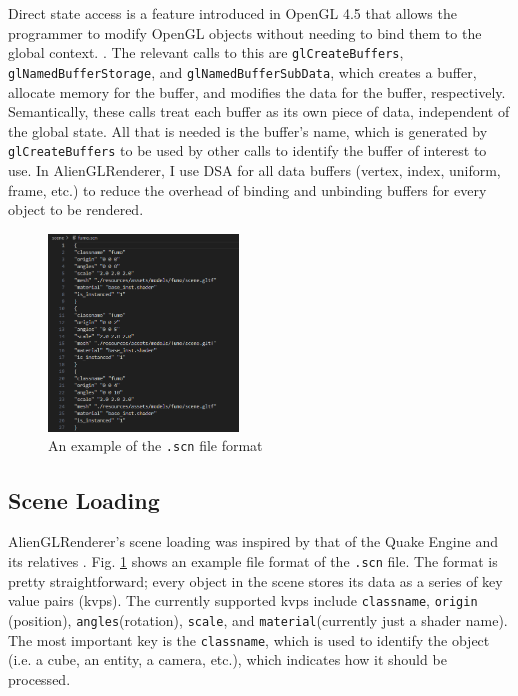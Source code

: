 \documentclass[letterpaper, 10 pt, conference]{ieeeconf}  %
\begin{document}
Direct state access is a feature introduced in OpenGL 4.5 that allows the programmer to modify OpenGL objects without needing to bind them to the global context. . The relevant calls to this are \texttt{glCreateBuffers}, \texttt{glNamedBufferStorage}, and \texttt{glNamedBufferSubData}, which creates a buffer, allocate memory for the buffer, and modifies the data for the buffer, respectively. Semantically, these calls treat each buffer as its own piece of data, independent of the global state. All that is needed is the buffer's name, which is generated by \texttt{glCreateBuffers} to be used by other calls to identify the buffer of interest to use. In AlienGLRenderer, I use DSA for all data buffers (vertex, index, uniform, frame, etc.) to reduce the overhead of binding and unbinding buffers for every object to be rendered. 


\begin{figure}
        \centering
        \includegraphics[width=0.45\textwidth]{scn.PNG}
        \caption{An example of the \texttt{.scn} file format} \label{fig:scn}
\end{figure}


\subsection {Scene Loading}
AlienGLRenderer's scene loading was inspired by that of the Quake Engine and its relatives \cite{quake}. Fig. \ref{fig:scn} shows an example file format of the \texttt{.scn} file. The format is pretty straightforward; every object in the scene stores its data as a series of key value pairs (kvps). The currently supported kvps include \texttt{classname}, \texttt{origin} (position), \texttt{angles}(rotation), \texttt{scale}, and \texttt{material}(currently just a shader name). The most important key is the \texttt{classname}, which is used to identify the object (i.e. a cube, an entity, a camera, etc.), which indicates how it should be processed.
\end{document}
